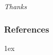\documentclass[8pt,t,usepdftitle=false]{beamer}
\begin{document}
\begin{frame}[t,plain]
  \begin{center}
    \vspace*{\fill}
    \LARGE\emph{\it Thanks}
    \vspace*{\fill}
  \end{center}
\end{frame}
\begin{frame}  
  \frametitle{References}
  \bibitemsep1ex
  \renewcommand{\bibfont}{\normalfont\small}
  \printbibliography
\end{frame}
\end{document}
